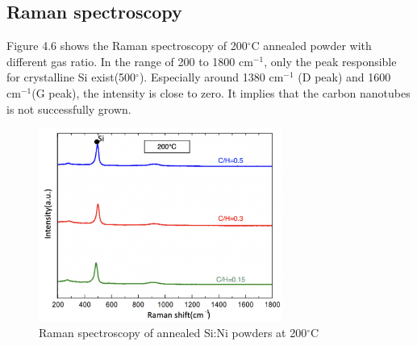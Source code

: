 \subsection{Raman spectroscopy}
Figure 4.6 shows the Raman spectroscopy of 200\(^\circ\)C annealed powder with different gas ratio. In the range of 200 to 1800 $\mathrm{cm^{-1}}$, only the peak responsible for crystalline Si exist(500\(^\circ\)). Especially around 1380 $\mathrm{cm^{-1}}$ (D peak) and 1600 $\mathrm{cm^{-1}}$(G peak), the intensity is close to zero. It implies that the carbon nanotubes is not successfully grown.  
\begin{figure}[h]
\centering
\includegraphics[width=8cm]{src/fig/fig46.png}
\caption{Raman spectroscopy of annealed Si:Ni powders at 200\(^\circ\)C}
\end{figure}
